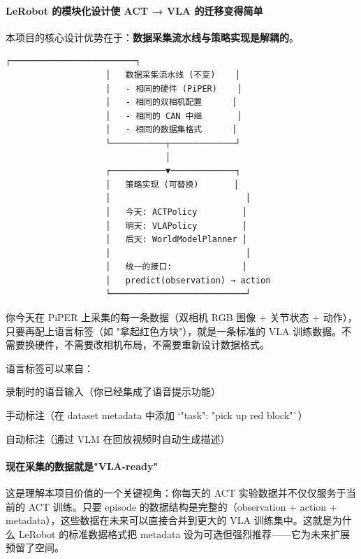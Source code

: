 \documentclass[UTF8,a4paper,11pt]{ctexart}
\begin{document}
{\paragraph{LeRobot 的模块化设计使 ACT → VLA 的迁移变得简单}


本项目的核心设计优势在于：\textbf{数据采集流水线与策略实现是解耦的}。

\begin{lstlisting}[language=text]
                    ┌─────────────────────────┐
                    │   数据采集流水线 (不变)    │
                    │   - 相同的硬件 (PiPER)    │
                    │   - 相同的双相机配置      │
                    │   - 相同的 CAN 中继       │
                    │   - 相同的数据集格式      │
                    └───────────┬─────────────┘
                                │
                    ┌───────────▼─────────────┐
                    │   策略实现 (可替换)       │
                    │                           │
                    │   今天: ACTPolicy         │
                    │   明天: VLAPolicy         │
                    │   后天: WorldModelPlanner │
                    │                           │
                    │   统一的接口:              │
                    │   predict(observation) → action
                    └───────────────────────────┘
\end{lstlisting}

你今天在 PiPER 上采集的每一条数据（双相机 RGB 图像 + 关节状态 + 动作），只要再配上语言标签（如 "拿起红色方块"），就是一条标准的 VLA 训练数据。不需要换硬件，不需要改相机布局，不需要重新设计数据格式。

语言标签可以来自：
\item 录制时的语音输入（你已经集成了语音提示功能）
\item 手动标注（在 dataset metadata 中添加 `"task": "pick up red block"`）
\item 自动标注（通过 VLM 在回放视频时自动生成描述）

\paragraph{现在采集的数据就是"VLA-ready"}


这是理解本项目价值的一个关键视角：你每天的 ACT 实验数据并不仅仅服务于当前的 ACT 训练。只要 episode 的数据结构是完整的（observation + action + metadata），这些数据在未来可以直接合并到更大的 VLA 训练集中。这就是为什么 LeRobot 的标准数据格式把 metadata 设为可选但强烈推荐——它为未来扩展预留了空间。

}
\end{document}
